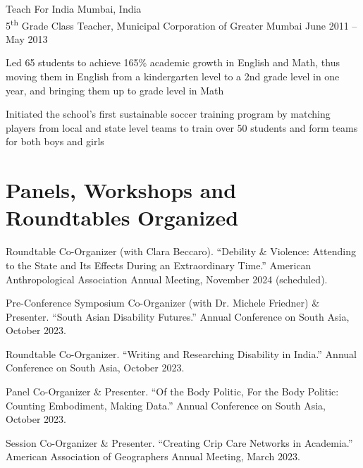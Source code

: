 \documentclass[11pt,letterpaper]{report}
\newcommand{\listitemspace}{0.25em}
\renewenvironment{itemize}{\begin{list}{}{\setlength{\leftmargin}{0em}\setlength{\parskip}{0em}\setlength{\itemsep}{\listitemspace}\setlength{\parsep}{\listitemspace}}}{\end{list}}
\begin{document}
    Teach For India Mumbai, India\\
    5\textsuperscript{th} Grade Class Teacher, Municipal Corporation of Greater Mumbai June 2011 – May 2013
    \begin{itemize}
        \item Led 65 students to achieve 165\% academic growth in English and Math, thus moving them in English from a kindergarten level to a 2nd grade level in one year, and bringing them up to grade level in Math
        \item Initiated the school's first sustainable soccer training program by matching players from local and state level teams to train over 50 students and form teams for both boys and girls
    \end{itemize}

    \section*{Panels, Workshops and Roundtables Organized}
    \begin{itemize}
        \item Roundtable Co-Organizer (with Clara Beccaro). “Debility \& Violence: Attending to the State and Its Effects During an Extraordinary Time.” American Anthropological Association Annual Meeting, November 2024 (scheduled).
        \item Pre-Conference Symposium Co-Organizer (with Dr. Michele Friedner) \& Presenter. “South Asian Disability Futures.” Annual Conference on South Asia, October 2023.
        \item Roundtable Co-Organizer. “Writing and Researching Disability in India.” Annual Conference on South Asia, October 2023.
        \item Panel Co-Organizer \& Presenter. “Of the Body Politic, For the Body Politic: Counting Embodiment, Making Data.” Annual Conference on South Asia, October 2023.
        \item Session Co-Organizer \& Presenter. “Creating Crip Care Networks in Academia.” American Association of Geographers Annual Meeting, March 2023.
    \end{itemize}
\end{document}
